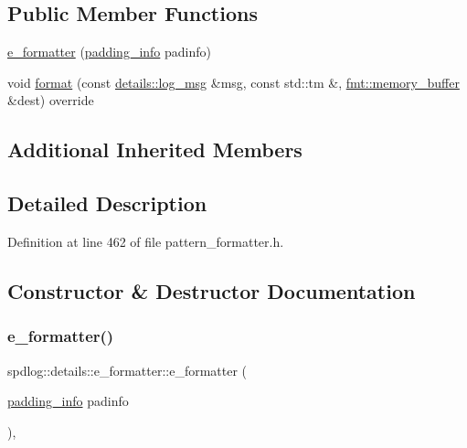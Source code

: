 \subsection*{Public Member Functions}
\begin{DoxyCompactItemize}
\item 
\hyperlink{classspdlog_1_1details_1_1e__formatter_a75148ba81c9eac2025b6c405acd51ea3}{e\+\_\+formatter} (\hyperlink{structspdlog_1_1details_1_1padding__info}{padding\+\_\+info} padinfo)
\item 
void \hyperlink{classspdlog_1_1details_1_1e__formatter_a931a5482cce50c580dd4e570fd27e976}{format} (const \hyperlink{structspdlog_1_1details_1_1log__msg}{details\+::log\+\_\+msg} \&msg, const std\+::tm \&, \hyperlink{format_8h_a21cbf729f69302f578e6db21c5e9e0d2}{fmt\+::memory\+\_\+buffer} \&dest) override
\end{DoxyCompactItemize}
\subsection*{Additional Inherited Members}


\subsection{Detailed Description}


Definition at line 462 of file pattern\+\_\+formatter.\+h.



\subsection{Constructor \& Destructor Documentation}
\mbox{\label{classspdlog_1_1details_1_1e__formatter_a75148ba81c9eac2025b6c405acd51ea3}} 
\subsubsection{\texorpdfstring{e\+\_\+formatter()}{e\_formatter()}}
{\footnotesize\ttfamily spdlog\+::details\+::e\+\_\+formatter\+::e\+\_\+formatter (\begin{DoxyParamCaption}\item[{\hyperlink{structspdlog_1_1details_1_1padding__info}{padding\+\_\+info}}]{padinfo }\end{DoxyParamCaption})\hspace{0.3cm}{\ttfamily [inline]}, {\ttfamily [explicit]}}



